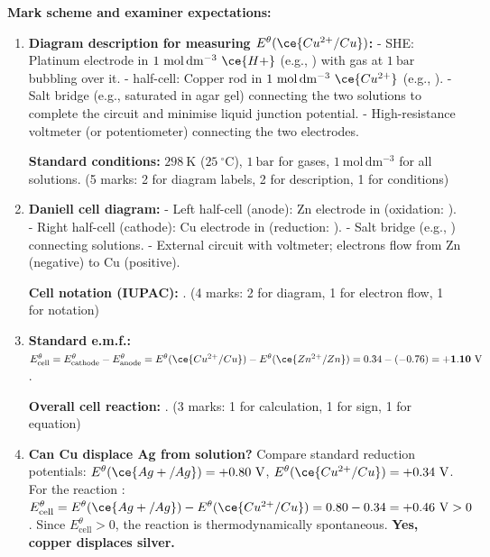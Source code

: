 \documentclass[11pt]{article}
\begin{document}
\begin{corrige}
\textbf{Mark scheme and examiner expectations:}
\begin{enumerate}
\item \textbf{Diagram description for measuring $E^\theta(\ce{Cu^{2+}/Cu})$:} 
- SHE: Platinum electrode in $1\ \mathrm{mol\,dm^{-3}}\ \ce{H+}$ (e.g., ) with  gas at $1\ \mathrm{bar}$ bubbling over it.
-  half-cell: Copper rod in $1\ \mathrm{mol\,dm^{-3}}\ \ce{Cu^{2+}}$ (e.g., ).
- Salt bridge (e.g., saturated  in agar gel) connecting the two solutions to complete the circuit and minimise liquid junction potential.
- High-resistance voltmeter (or potentiometer) connecting the two electrodes.
\par \textbf{Standard conditions:} $298\ \mathrm{K}$ ($25\ ^\circ\mathrm{C}$), $1\ \mathrm{bar}$ for gases, $1\ \mathrm{mol\,dm^{-3}}$ for all solutions. \hfill (5 marks: 2 for diagram labels, 2 for description, 1 for conditions)
\item \textbf{Daniell cell diagram:}
- Left half-cell (anode): Zn electrode in  (oxidation: ).
- Right half-cell (cathode): Cu electrode in  (reduction: ).
- Salt bridge (e.g., ) connecting solutions.
- External circuit with voltmeter; electrons flow from Zn (negative) to Cu (positive).
\par \textbf{Cell notation (IUPAC):} . \hfill (4 marks: 2 for diagram, 1 for electron flow, 1 for notation)
\item \textbf{Standard e.m.f.:} $E^\theta_{\text{cell}} = E^\theta_{\text{cathode}} - E^\theta_{\text{anode}} = E^\theta(\ce{Cu^{2+}/Cu}) - E^\theta(\ce{Zn^{2+}/Zn}) = 0.34 - (-0.76) = \mathbf{+1.10\ \mathrm{V}}$.
\par \textbf{Overall cell reaction:} . \hfill (3 marks: 1 for calculation, 1 for sign, 1 for equation)
\item \textbf{Can Cu displace Ag from  solution?} 
Compare standard reduction potentials: $E^\theta(\ce{Ag+/Ag}) = +0.80\ \mathrm{V}$, $E^\theta(\ce{Cu^{2+}/Cu}) = +0.34\ \mathrm{V}$.
For the reaction :
$E^\theta_{\text{cell}} = E^\theta(\ce{Ag+/Ag}) - E^\theta(\ce{Cu^{2+}/Cu}) = 0.80 - 0.34 = +0.46\ \mathrm{V} > 0$.
Since $E^\theta_{\text{cell}} > 0$, the reaction is thermodynamically spontaneous. \textbf{Yes, copper displaces silver.}

\end{enumerate}
\end{corrige}
\end{document}
